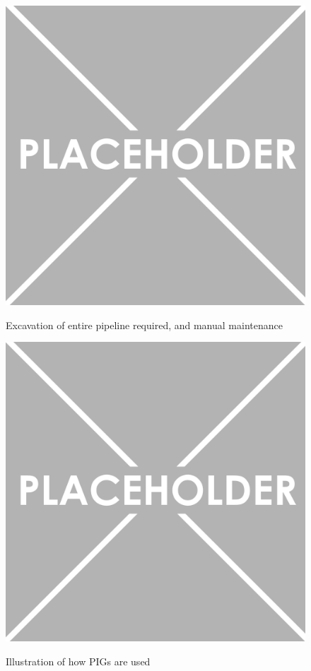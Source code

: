 \documentclass[11pt]{article}		%
\newlength{\imageheight}	 %
\begin{document}
		\begin{figure}[h]
					\centering
					\begin{multicols}{2}
						\includegraphics[height=\imageheight]{placeholder}
						\caption{Excavation of entire pipeline required, and manual maintenance}
						\label{placeholder}
						\columnbreak
						\includegraphics[height=\imageheight]{placeholder}
						\caption{Illustration of how PIGs are used}
						\label{placeholder2}
					\end{multicols}
				\end{figure}
				
\end{document}
